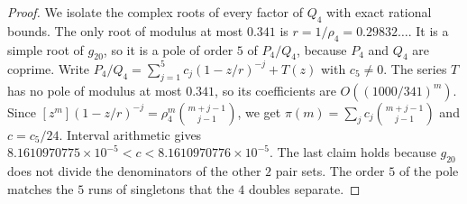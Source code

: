 \begin{proof}
We isolate the complex roots of every factor of $Q_4$ with exact rational
bounds. The only root of modulus at most $0.341$ is $r=1/\rho_4=0.29832\ldots$.
It is a simple root of $g_{20}$, so it is a pole of order $5$ of $P_4/Q_4$,
because $P_4$ and $Q_4$ are coprime. Write
$P_4/Q_4=\sum_{j=1}^{5}c_j(1-z/r)^{-j}+T(z)$ with $c_5\ne0$. The series $T$
has no pole of modulus at most $0.341$, so its coefficients are
$O((1000/341)^m)$. Since $[z^m](1-z/r)^{-j}=\rho_4^m\binom{m+j-1}{j-1}$, we get
$\pi(m)=\sum_jc_j\binom{m+j-1}{j-1}$ and $c=c_5/24$. Interval arithmetic gives
$8.1610970775\times10^{-5}<c<8.1610970776\times10^{-5}$. The last claim holds
because $g_{20}$ does not divide the denominators of the other $2$ pair sets.
The order $5$ of the pole matches the $5$ runs of singletons that the $4$
doubles separate.
\end{proof}

